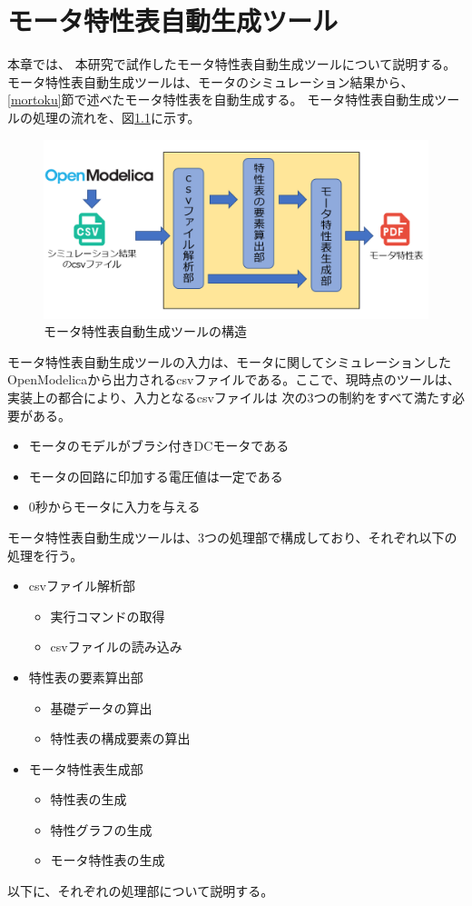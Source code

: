 \chapter{モータ特性表自動生成ツール}\label{cha:Tool}
本章では、 本研究で試作したモータ特性表自動生成ツールについて説明する。
モータ特性表自動生成ツールは、モータのシミュレーション結果から、\ref{mortoku}節で述べたモータ特性表を自動生成する。
モータ特性表自動生成ツールの処理の流れを、図\ref{fig:kouzou}に示す。
\begin{figure}[t]
	\centering
	\includegraphics[width=14cm]{./Image/kouzou.png}
    \caption{モータ特性表自動生成ツールの構造}
	\label{fig:kouzou}
  \end{figure}
モータ特性表自動生成ツールの入力は、モータに関してシミュレーションしたOpenModelicaから出力されるcsvファイルである。ここで、現時点のツールは、実装上の都合により、入力となるcsvファイルは
次の3つの制約をすべて満たす必要がある。
\begin{itemize}
    \item モータのモデルがブラシ付きDCモータである
    \item モータの回路に印加する電圧値は一定である
    \item 0秒からモータに入力を与える
\end{itemize}
モータ特性表自動生成ツールは、3つの処理部で構成しており、それぞれ以下の処理を行う。
\begin{itemize}
    \item csvファイル解析部
    \begin{itemize}
        \item 実行コマンドの取得
        \item csvファイルの読み込み
    \end{itemize}
    \item 特性表の要素算出部
    \begin{itemize}
        \item 基礎データの算出
        \item 特性表の構成要素の算出
    \end{itemize}
    \item モータ特性表生成部
    \begin{itemize}
        \item 特性表の生成
        \item 特性グラフの生成
        \item モータ特性表の生成
    \end{itemize}
\end{itemize}
以下に、それぞれの処理部について説明する。
